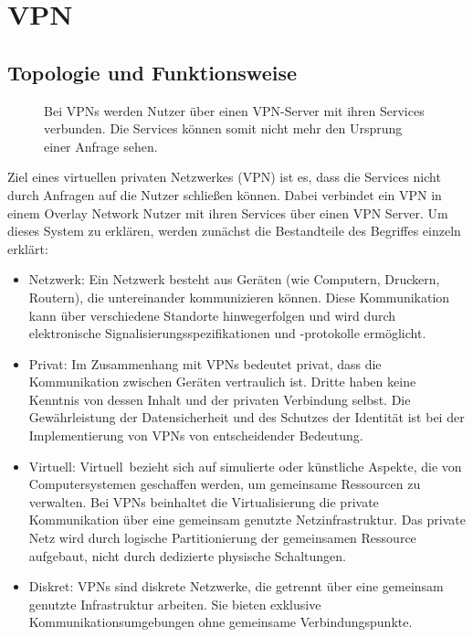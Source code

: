 \section{VPN}
\label{chap:vpn}

\subsection{Topologie und Funktionsweise}
\label{chap:vpn_topology}

\begin{figure}[h!]
    \centering
    
    \caption{Bei VPNs werden Nutzer über einen VPN-Server mit ihren Services verbunden. Die Services können somit nicht mehr den Ursprung einer Anfrage sehen.}
    \label{imgs:vpn}
\end{figure}

Ziel eines virtuellen privaten Netzwerkes (VPN) ist es, dass die Services nicht durch Anfragen auf die Nutzer schließen können. Dabei verbindet ein VPN in einem Overlay Network Nutzer mit ihren Services über einen VPN Server. Um dieses System zu erklären, werden zunächst die Bestandteile des Begriffes einzeln erklärt:

\begin{itemize}
    \item Netzwerk: Ein Netzwerk besteht aus Geräten (wie Computern, Druckern, Routern), die untereinander kommunizieren können. Diese Kommunikation kann über verschiedene Standorte hinwegerfolgen und wird durch elektronische Signalisierungsspezifikationen und -protokolle ermöglicht.
    \item Privat: Im Zusammenhang mit VPNs bedeutet \glqq privat\grqq, dass die Kommunikation zwischen Geräten vertraulich ist. Dritte haben keine Kenntnis von dessen Inhalt und der privaten Verbindung selbst. Die Gewährleistung der Datensicherheit und des Schutzes der Identität ist bei der Implementierung von VPNs von entscheidender Bedeutung.
    \item Virtuell: \glqq Virtuell\grqq\ bezieht sich auf simulierte oder künstliche Aspekte, die von Computersystemen geschaffen werden, um gemeinsame Ressourcen zu verwalten. Bei VPNs beinhaltet die Virtualisierung die private Kommunikation über eine gemeinsam genutzte Netzinfrastruktur. Das private Netz wird durch logische Partitionierung der gemeinsamen Ressource aufgebaut, nicht durch dedizierte physische Schaltungen.
    \item Diskret: VPNs sind diskrete Netzwerke, die getrennt über eine gemeinsam genutzte Infrastruktur arbeiten. Sie bieten exklusive Kommunikationsumgebungen ohne gemeinsame Verbindungspunkte.
\end{itemize}

